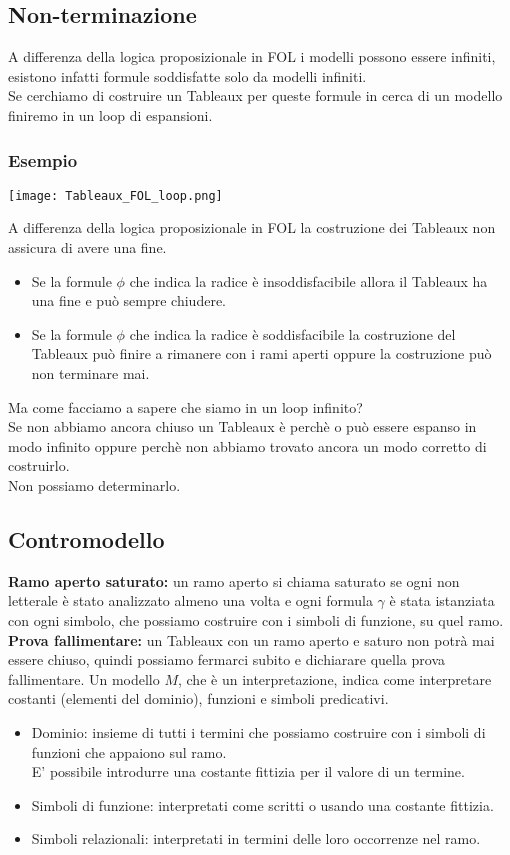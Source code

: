 \documentclass[../main.tex]{subfiles}
\newcommand{\spazio}{\vspace{1em} \newline}
\begin{document}
   \subsection{Non-terminazione}
   A differenza della logica proposizionale in FOL i modelli possono essere infiniti, esistono infatti formule soddisfatte solo da modelli infiniti.\\
   Se cerchiamo di costruire un Tableaux per queste formule in cerca di un modello finiremo in un loop di espansioni.

   \subsubsection{Esempio}
   \begin{center}
      \texttt{[image: Tableaux\_FOL\_loop.png]}
   \end{center}
   A differenza della logica proposizionale in FOL la costruzione dei Tableaux non assicura di avere una fine.
   \begin{itemize}
      \item Se la formule $\phi$ che indica la radice è insoddisfacibile allora il Tableaux ha una fine e può sempre chiudere.
      \item Se la formule $\phi$ che indica la radice è soddisfacibile la costruzione del Tableaux può finire a rimanere con i rami aperti oppure la costruzione può non terminare mai.
   \end{itemize}
   Ma come facciamo a sapere che siamo in un loop infinito?\\
   Se non abbiamo ancora chiuso un Tableaux è perchè o può essere espanso in modo infinito oppure perchè non abbiamo trovato ancora un modo corretto di costruirlo.\\
   Non possiamo determinarlo.

   \subsection{Contromodello}
   \textbf{Ramo aperto saturato:} un ramo aperto si chiama saturato se ogni non letterale è stato analizzato almeno una volta e ogni formula $\gamma$ è stata istanziata con ogni simbolo, che possiamo costruire con i simboli di funzione, su quel ramo.
   \spazio
   \textbf{Prova fallimentare:} un Tableaux con un ramo aperto e saturo non potrà mai essere chiuso, quindi possiamo fermarci subito e dichiarare quella prova fallimentare.
   \spazio
   Un modello $M$, che è un interpretazione, indica come interpretare costanti (elementi del dominio), funzioni e simboli predicativi.
   \begin{itemize}
      \item Dominio: insieme di tutti i termini che possiamo costruire con i simboli di funzioni che appaiono sul ramo.\\
         E' possibile introdurre una costante fittizia per il valore di un termine.
      \item Simboli di funzione: interpretati come scritti o usando una costante fittizia.
      \item Simboli relazionali: interpretati in termini delle loro occorrenze nel ramo.
   \end{itemize}
\end{document}
